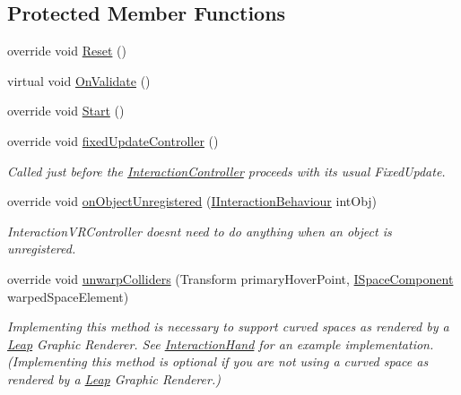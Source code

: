 \subsection*{Protected Member Functions}
\begin{DoxyCompactItemize}
\item 
override void \mbox{\hyperlink{class_leap_1_1_unity_1_1_interaction_1_1_interaction_x_r_controller_a17a8608c8d69b586256fbcb9877394b3}{Reset}} ()
\item 
virtual void \mbox{\hyperlink{class_leap_1_1_unity_1_1_interaction_1_1_interaction_x_r_controller_ac43db0f1fd87084d1b1468ce95bd58ac}{On\+Validate}} ()
\item 
override void \mbox{\hyperlink{class_leap_1_1_unity_1_1_interaction_1_1_interaction_x_r_controller_ac50b109d0cd82bb14cd8a19199850c9e}{Start}} ()
\item 
override void \mbox{\hyperlink{class_leap_1_1_unity_1_1_interaction_1_1_interaction_x_r_controller_aa7e13f419009b2f0fd02018cc96f81b4}{fixed\+Update\+Controller}} ()
\begin{DoxyCompactList}\small\item\em Called just before the \mbox{\hyperlink{class_leap_1_1_unity_1_1_interaction_1_1_interaction_controller}{Interaction\+Controller}} proceeds with its usual Fixed\+Update. \end{DoxyCompactList}\item 
override void \mbox{\hyperlink{class_leap_1_1_unity_1_1_interaction_1_1_interaction_x_r_controller_ab287ac4fbd0ba8471ef9787a371470ef}{on\+Object\+Unregistered}} (\mbox{\hyperlink{interface_leap_1_1_unity_1_1_interaction_1_1_i_interaction_behaviour}{I\+Interaction\+Behaviour}} int\+Obj)
\begin{DoxyCompactList}\small\item\em Interaction\+V\+R\+Controller doesn\textquotesingle{}t need to do anything when an object is unregistered. \end{DoxyCompactList}\item 
override void \mbox{\hyperlink{class_leap_1_1_unity_1_1_interaction_1_1_interaction_x_r_controller_aae371c99d08f9ce6e8850e36109690c5}{unwarp\+Colliders}} (Transform primary\+Hover\+Point, \mbox{\hyperlink{interface_leap_1_1_unity_1_1_space_1_1_i_space_component}{I\+Space\+Component}} warped\+Space\+Element)
\begin{DoxyCompactList}\small\item\em Implementing this method is necessary to support curved spaces as rendered by a \mbox{\hyperlink{namespace_leap_1_1_unity_1_1_leap}{Leap}} Graphic Renderer. See \mbox{\hyperlink{class_leap_1_1_unity_1_1_interaction_1_1_interaction_hand}{Interaction\+Hand}} for an example implementation. (Implementing this method is optional if you are not using a curved space as rendered by a \mbox{\hyperlink{namespace_leap_1_1_unity_1_1_leap}{Leap}} Graphic Renderer.) \end{DoxyCompactList}\item 

\end{DoxyCompactItemize}
